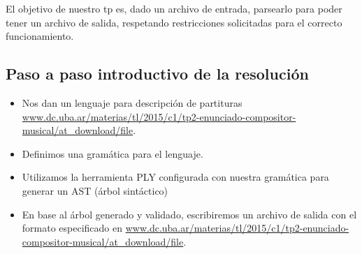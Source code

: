 El objetivo de nuestro tp es, dado un archivo de entrada, parsearlo para poder tener un archivo de salida, respetando restricciones solicitadas para el correcto funcionamiento.

\subsection{Paso a paso introductivo de la resolución}
\begin{itemize}
\item Nos dan un lenguaje para descripción de partituras \url{www.dc.uba.ar/materias/tl/2015/c1/tp2-enunciado-compositor-musical/at_download/file}.
\item Definimos una gramática para el lenguaje.
\item Utilizamos la herramienta PLY configurada con nuestra gramática para generar un AST (árbol sintáctico)
\item En base al árbol generado y validado, escribiremos un archivo de salida con el formato especificado en \url{www.dc.uba.ar/materias/tl/2015/c1/tp2-enunciado-compositor-musical/at_download/file}.
\end{itemize}
